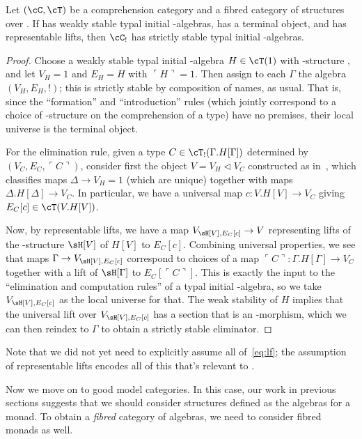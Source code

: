 \documentclass{amsart}
\def\name#1{\ulcorner #1\urcorner}
\let\S\cS
\let\C\cC
\let\T\cT
\begin{document}
\begin{lem}
  Let $(\C,\T)$ be a comprehension category and \S a fibred category of structures over \C.
  If \C has weakly stable typal initial \S-algebras, \C has a terminal object, and \S has representable lifts, then $\C_!$ has strictly stable typal initial \S-algebras.
\end{lem}
\begin{proof}
  Choose a weakly stable typal initial \S-algebra $H\in\T(1)$ with \S-structure \sH, and let $V_H = 1$ and $E_H = H$ with $\name{H}= 1$.
  Then assign to each $\Gamma$ the algebra $(V_H,E_H,!)$; this is strictly stable by composition of names, as usual.
  That is, since the ``formation'' and ``introduction'' rules (which jointly correspond to a choice of \S-structure on the comprehension of a type) have no premises, their local universe is the terminal object.

  For the elimination rule, given a type $C\in \T_!(\Gamma.H[\Gamma])$ determined by $(V_C,E_C,\name{C})$, consider first the object $V = V_H\triangleleft V_C$ constructed as in~\cite{lw:localuniv}, which classifies maps $\Delta \to V_H = 1$ (which are unique) together with maps $\Delta.H[\Delta] \to V_C$.
  In particular, we have a universal map $c:V.H[V]\to V_C$ giving $E_C[c]\in \T(V.H[V])$.

  Now, by representable lifts, we have a map $V_{\sH[V],E_C[c]} \to V$ representing lifts of the \S-structure $\sH[V]$ of $H[V]$ to $E_C[c]$.
  Combining universal properties, we see that maps $\Gamma\to V_{\sH[V],E_C[c]}$ correspond to choices of a map $\name{C}:\Gamma.H[\Gamma]\to V_C$ together with a lift of $\sH[\Gamma]$ to $E_C[\name{C}]$.
  This is exactly the input to the ``elimination and computation rules'' of a typal initial \S-algebra, so we take $V_{\sH[V],E_C[c]}$ as the local universe for that.
  The weak stability of $H$ implies that the universal lift over $V_{\sH[V],E_C[c]}$ has a section that is an \S-morphism, which we can then reindex to $\Gamma$ to obtain a strictly stable eliminator.
\end{proof}

Note that we did not yet need to explicitly assume all of~\eqref{eq:lf}; the assumption of representable lifts encodes all of this that's relevant to \S.

Now we move on to good model categories.
In this case, our work in previous sections suggests that we should consider structures defined as the algebras for a monad.
To obtain a \emph{fibred} category of algebras, we need to consider fibred monads as well.
\end{document}

